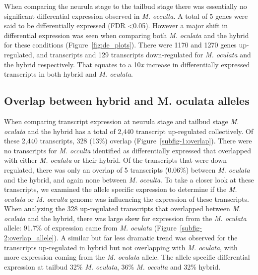 When comparing the neurula stage to the tailbud stage there was essentially no significant differential expression observed in \textit{M. occulta}. A total of 5 genes were said to be differentially expressed (FDR \textless 0.05). However a major shift in differential expression was seen when comparing both \textit{M. oculata} and the hybrid for these conditions (Figure~\ref{fig:de_plots}). There were 1170 and 1270 genes up-regulated, and transcripts and 129 transcripts down-regulated for \textit{M. oculata} and the hybrid respectively. That equates to a 10\textit{x} increase in differentially expressed transcripts in both hybrid and \textit{M. oculata}.

\subsection{Overlap between hybrid and M. oculata alleles}
When comparing transcript expression at neurula stage and tailbud stage \textit{M. oculata} and the hybrid has a total of 2,440 transcript up-regulated collectively. Of these 2,440 transcripts, 328 (13\%) overlap (Figure~\ref{subfig-1:overlap}). There were no transcripts for \textit{M. occulta} identified as differentially expressed that overlapped with either \textit{M. oculata} or their hybrid. Of the transcripts that were down regulated, there was only an overlap of 5 transcripts (0.06\%) between \textit{M. oculata} and the hybrid, and again none between \textit{M. occulta}. To take a closer look at these transcripts, we examined the allele specific expression to determine if the \textit{M. oculata} or \textit{M. occulta} genome was influencing the expression of these transcripts. When analyzing the 328 up-regulated transcripts that overlapped between \textit{M. oculata} and the hybrid, there was large skew for expression from the \textit{M. oculata} allele: 91.7\% of expression came from \textit{M. oculata} (Figure~\ref{subfig-2:overlap_allele}). A similar but far less dramatic trend was observed for the transcripts up-regulated in hybrid but not overlapping with \textit{M. oculata}, with more expression coming from the \textit{M. oculata} allele. The allele specific differential expression at tailbud 32\% \textit{M. oculata}, 36\% \textit{M. occulta} and 32\% hybrid.

